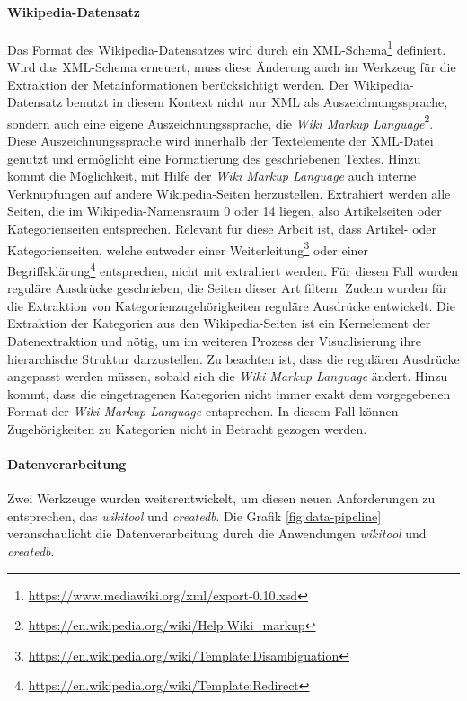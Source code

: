 \paragraph{Wikipedia-Datensatz}
Das Format des Wikipedia-Datensatzes wird durch ein XML-Schema\footnote{\url{https://www.mediawiki.org/xml/export-0.10.xsd}} definiert.
Wird das XML-Schema erneuert, muss diese Änderung auch im Werkzeug für die Extraktion der Metainformationen berücksichtigt werden.
Der Wikipedia-Datensatz benutzt in diesem Kontext nicht nur XML als Auszeichnungssprache, sondern auch eine eigene Auszeichnungssprache, die \emph{Wiki Markup Language}\footnote{\url{https://en.wikipedia.org/wiki/Help:Wiki\_markup}}. 
Diese Auszeichnungssprache wird innerhalb der Textelemente der XML-Datei genutzt und ermöglicht eine Formatierung des geschriebenen Textes.
Hinzu kommt die Möglichkeit, mit Hilfe der \emph{Wiki Markup Language} auch interne Verknüpfungen auf andere Wikipedia-Seiten herzustellen.
Extrahiert werden alle Seiten, die im Wikipedia-Namensraum 0 oder 14 liegen, also Artikelseiten oder Kategorienseiten entsprechen.
Relevant für diese Arbeit ist, dass Artikel- oder Kategorienseiten, welche entweder einer Weiterleitung\footnote{\url{https://en.wikipedia.org/wiki/Template:Disambiguation}} oder einer Begriffsklärung\footnote{\url{https://en.wikipedia.org/wiki/Template:Redirect}} entsprechen, nicht mit extrahiert werden.
Für diesen Fall wurden reguläre Ausdrücke geschrieben, die Seiten dieser Art filtern.
Zudem wurden für die Extraktion von Kategorienzugehörigkeiten reguläre Ausdrücke entwickelt.
Die Extraktion der Kategorien aus den Wikipedia-Seiten ist ein Kernelement der Datenextraktion und nötig, um im weiteren Prozess der Visualisierung ihre hierarchische Struktur darzustellen.
Zu beachten ist, dass die regulären Ausdrücke angepasst werden müssen, sobald sich die \emph{Wiki Markup Language} ändert.
Hinzu kommt, dass die eingetragenen Kategorien nicht immer exakt dem vorgegebenen Format der \emph{Wiki Markup Language} entsprechen. In diesem Fall können Zugehörigkeiten zu Kategorien nicht in Betracht gezogen werden.

\paragraph{Datenverarbeitung} \label{subchap:datenverarbeitung}
Zwei Werkzeuge wurden weiterentwickelt, um diesen neuen Anforderungen zu entsprechen, das \emph{wikitool} und \emph{createdb}.
Die Grafik \ref{fig:data-pipeline} veranschaulicht die Datenverarbeitung durch die Anwendungen \emph{wikitool} und \emph{createdb}.

